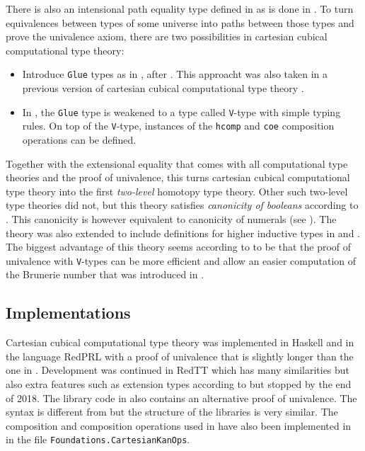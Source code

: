 \documentclass[12pt,a4paper,twoside,xetex]{book} %
\newcommand{\keyword}[1]{\emph{#1}\index{#1}}
\begin{document}
There is also an intensional path equality type defined in \cite{Angiuli2018} as 
is done in \cite{Huber2016}. To turn equivalences between types of some universe 
into paths between those types and prove the univalence axiom, there are two 
possibilities in cartesian cubical computational type theory:

\begin{itemize}
 \item Introduce \texttt{Glue} types as in , after 
\cite{Huber2016}. This approacht was also taken in a previous version of cartesian cubical 
computational type theory \cite{Angiuli2017}.
 \item In \cite{Angiuli2018}, the \texttt{Glue} type is weakened to a type 
called \texttt{V}-type with simple typing rules. On top of the \texttt{V}-type, 
instances of the \texttt{hcomp} and \texttt{coe} composition operations can be 
defined.
\end{itemize}


Together with the extensional equality that comes with all computational type 
theories and the proof of univalence, this turns cartesian cubical computational 
type theory into the first \keyword{two-level} homotopy type theory. Other such 
two-level type theories did not, but this theory satisfies \keyword{canonicity 
of booleans} according to \cite{Angiuli2018}. This canonicity is however 
equivalent to canonicity of numerals (see ). The theory was 
also extended to include definitions for higher inductive types in 
\cite{CavHar18} and \cite{CaHa19}. The biggest advantage of this theory seems 
according to \cite{Moertberg2018Bonn} to be that the proof of univalence with 
\texttt{V}-types can be more efficient and allow an easier computation of the 
Brunerie number that was introduced in .

\subsection{Implementations}

Cartesian cubical computational type theory was implemented in Haskell \cite{MorAng18} and in the language RedPRL \cite{Sterling2018a} with a proof of univalence that is slightly longer than the one in \cite{Moertberg2018}. Development was continued in RedTT 
\cite{Sterling2018b} which has many similarities but also extra features such as 
extension types according to \cite{Moertberg2018a} but stopped by the end of 
2018. The library code in \cite{Sterling2018b} also contains an alternative 
proof of univalence. The syntax is different from \cite{Moertberg2018} but the 
structure of the libraries is very similar. The composition and composition 
operations used in \cite{Sterling2018b} have also been implemented in 
\cite{Moertberg2018} in the file \texttt{Foundations.CartesianKanOps}. 
\end{document}
